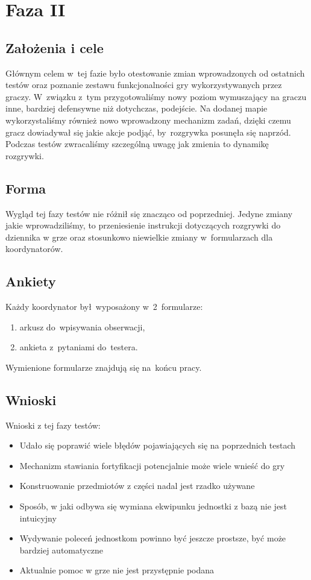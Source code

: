 \documentclass[licencjacka]{pracamgr}
\begin{document}
  \section{Faza II}

    \subsection{Założenia i cele}
      Głównym celem w~tej fazie było otestowanie zmian wprowadzonych od ostatnich testów oraz poznanie zestawu funkcjonalności gry
      wykorzystywanych przez graczy. W~związku z~tym przygotowaliśmy nowy poziom wymuszający na graczu inne, bardziej defensywne
      niż dotychczas, podejście. Na dodanej mapie wykorzystaliśmy również nowo wprowadzony mechanizm zadań, dzięki czemu gracz
      dowiadywał się jakie akcje podjąć, by~rozgrywka posunęła się naprzód. Podczas testów zwracaliśmy szczególną uwagę jak zmienia
      to dynamikę rozgrywki.

    \subsection{Forma}
      Wygląd tej fazy testów nie różnił się znacząco od poprzedniej. Jedyne zmiany jakie wprowadziliśmy,
      to przeniesienie instrukcji dotyczących rozgrywki do dziennika w grze oraz stosunkowo niewielkie zmiany
      w~formularzach dla koordynatorów.

    \subsection{Ankiety}
      Każdy koordynator był~wyposażony w~2~formularze:
      \begin{enumerate}
	\item arkusz do~wpisywania obserwacji,
	\item ankieta z~pytaniami do~testera.
      \end{enumerate}

      \noindent
      Wymienione formularze znajdują się na~końcu pracy.

    \subsection{Wnioski}
      Wnioski z tej fazy testów:
      \begin{itemize}
	\item Udało się poprawić wiele błędów pojawiających się na poprzednich testach
	\item Mechanizm stawiania fortyfikacji potencjalnie może wiele wnieść do gry
	\item Konstruowanie przedmiotów z części nadal jest rzadko używane
	\item Sposób, w jaki odbywa się wymiana ekwipunku jednostki z bazą nie jest intuicyjny
	\item Wydywanie poleceń jednostkom powinno być jeszcze prostsze, być może bardziej automatyczne
	\item Aktualnie pomoc w grze nie jest przystępnie podana
      \end{itemize}
\end{document}
